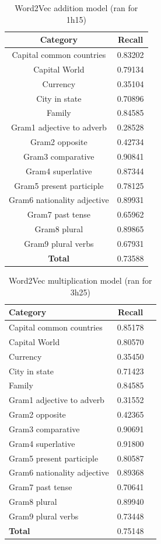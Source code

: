 \label{sec:tabellen}
\begin{table}[h!]
\centering
\begin{tabular}{|c|c|}
   	\hline
   	\textbf{Category} &    \textbf{Recall}\\ \hline
   	Capital common countries 	& 0.83202 \\
   	Capital World 				& 0.79134 \\
   	Currency					& 0.35104 \\
   	City in state				& 0.70896 \\
   	Family 						& 0.84585 \\
   	Gram1 adjective to adverb 	& 0.28528 \\
   	Gram2 opposite 				& 0.42734 \\
   	Gram3 comparative 			& 0.90841 \\
   	Gram4 superlative 			& 0.87344 \\
   	Gram5 present participle	& 0.78125 \\
   	Gram6 nationality adjective & 0.89931 \\
   	Gram7 past tense 			& 0.65962 \\
   	Gram8 plural 				& 0.89865 \\
   	Gram9 plural verbs 			& 0.67931 \\
   	\textbf{Total}				& 0.73588 \\ \hline
\end{tabular}
\caption{Word2Vec addition model (ran for 1h15)}
\label{table:word2vec_addition}
\end{table}

\begin{table}[h!]
\centering
\begin{tabular}{| l | c | r}
   	\hline
   	\textbf{Category} &    \textbf{Recall}\\ \hline
   	Capital common countries 	& 0.85178 \\
   	Capital World 				& 0.80570 \\
   	Currency					& 0.35450 \\
   	City in state				& 0.71423 \\
   	Family 						& 0.84585 \\
   	Gram1 adjective to adverb 	& 0.31552 \\
   	Gram2 opposite 				& 0.42365 \\
   	Gram3 comparative 			& 0.90691 \\
   	Gram4 superlative 			& 0.91800 \\
   	Gram5 present participle	& 0.80587 \\
   	Gram6 nationality adjective & 0.89368 \\
   	Gram7 past tense 			& 0.70641 \\
   	Gram8 plural 				& 0.89940 \\
   	Gram9 plural verbs 			& 0.73448 \\
   	\textbf{Total}				& 0.75148 \\ \hline
\end{tabular}
\caption{Word2Vec multiplication model (ran for 3h25)}
\label{table:word2vec_multiplication}
\end{table}

